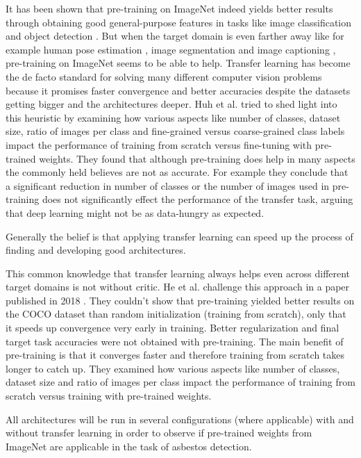 It has been shown that pre-training on ImageNet indeed yields better results through obtaining good general-purpose features in tasks like image classification \cite{sharif2014cnn} and object detection \cite{girshick2014rich, sermanet2013overfeat}. But when the target domain is even farther away like for example human pose estimation \cite{carreira2016human}, image segmentation \cite{dai2016instance} and image captioning \cite{donahue2015long, karpathy2015deep}, pre-training on ImageNet seems to be able to help. Transfer learning has become the de facto standard for solving many different computer vision problems because it promises faster convergence and better accuracies despite the datasets getting bigger and the architectures deeper. Huh et al. \cite{huh2016makes} tried to shed light into this heuristic by examining how various aspects like number of classes, dataset size, ratio of  images per class and fine-grained versus coarse-grained class labels impact the performance of training from scratch versus fine-tuning with pre-trained weights. They found that although pre-training does help in many aspects the commonly held believes are not as accurate. For example they conclude that a significant reduction in number of classes or the number of images used in pre-training does not significantly effect the performance of the transfer task, arguing that deep learning might not be as data-hungry as expected.

Generally the belief is that applying transfer learning can speed up the process of finding and developing good architectures.

This common knowledge that transfer learning always helps even across different target domains is not without critic. He et al. challenge this approach in a paper published in 2018 \cite{he2018rethinking}. They couldn't show that pre-training yielded better results on the COCO dataset than random initialization (training from scratch), only that it speeds up convergence very early in training. Better regularization and final target task accuracies were not obtained with pre-training. The main benefit of pre-training is that it converges faster and therefore training from scratch takes longer to catch up. They examined how various aspects like number of classes, dataset size and ratio of images per class impact the performance of training from scratch versus training with pre-trained weights.

All architectures will be run in several configurations (where applicable) with and without transfer learning in order to observe if pre-trained weights from ImageNet are applicable in the task of asbestos detection.

